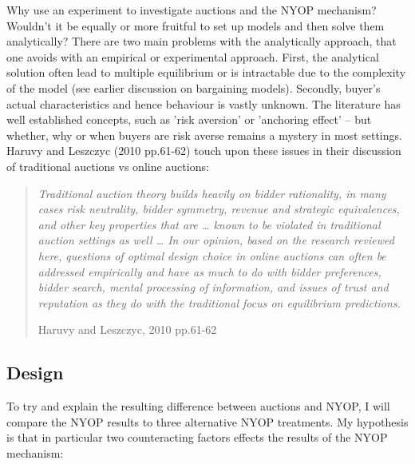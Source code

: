 \documentclass[a4paper,12pt]{article}
\begin{document}
	Why use an experiment to investigate auctions and the NYOP mechanism? Wouldn't it be equally or more fruitful to set up models and then solve them analytically? There are two main problems with the analytically approach, that one avoids with an empirical or experimental approach. First, the analytical solution often lead to multiple equilibrium or is intractable due to the complexity of the model (see earlier discussion on bargaining models). Secondly, buyer's actual characteristics and hence behaviour is vastly unknown. The literature has well established concepts, such as 'risk aversion' or 'anchoring effect' -- but whether, why or when buyers are risk averse remains a mystery in most settings. Haruvy and Leszczyc (2010 pp.61-62) touch upon these issues in their discussion of traditional auctions vs online auctions:
	\blockquote[Haruvy and Leszczyc, 2010 pp.61-62]{\emph{Traditional auction theory builds heavily on bidder rationality, in many cases risk neutrality, bidder symmetry, revenue and strategic equivalences, and other key properties that are … known to be violated in traditional auction settings as well … In our opinion, based on the research reviewed here, questions of optimal design choice in online auctions can often be addressed empirically and have as much to do with bidder preferences, bidder search, mental processing of information, and issues of trust and reputation as they do with the traditional focus on equilibrium predictions. }}


	\subsection{Design}

	To try and explain the resulting difference between auctions and NYOP, I will compare the NYOP results to three alternative NYOP treatments. My hypothesis is that in particular two counteracting factors effects the results of the NYOP mechanism:
\end{document}
